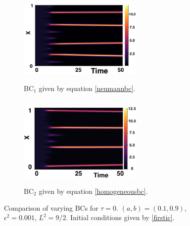 \begin{figure}[H]
    \centering
    \begin{subfigure}[t]{0.45\textwidth}
        \centering
        \includegraphics[width=6cm,height=4.5cm]{ic20.png}
        \caption{$\text{BC}_1$ given by equation \eqref{neumannbc}.}
        \label{}
    \end{subfigure}
    \hfill
    \begin{subfigure}[t]{0.45\textwidth}
        \centering
        \includegraphics[width=6cm,height=4.5cm]{bc0.png}
        \caption{$\text{BC}_2$ given by equation \eqref{homogeneousbc}.}
        \label{}
    \end{subfigure}
    \caption{Comparison of varying BCs for $\tau=0$. $(a,b)=(0.1,0.9)$, $\epsilon^2=0.001$, $L^2=9/2$. Initial conditions given by \eqref{firstic}.}
    \label{fig:bctau1}
\end{figure}

